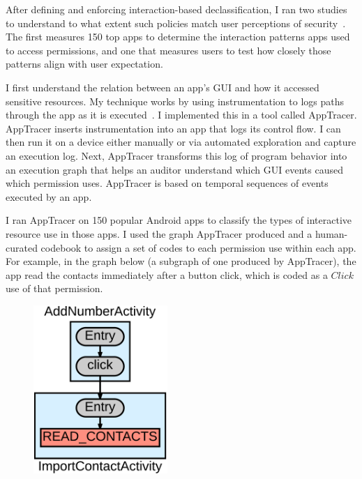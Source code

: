 After defining and enforcing interaction-based declassification, I ran
two studies to understand to what extent such policies match user
perceptions of security~\cite{micinski2017user}. The first measures
150 top apps to determine the interaction patterns apps used to access
permissions, and one that measures users to test how closely those
patterns align with user expectation.

I first understand the relation between an app's GUI and how it
accessed sensitive resources. My technique works by using
instrumentation to logs paths through the app as it is
executed~\cite{micinski2017}. I implemented this in a tool
called AppTracer.  AppTracer inserts instrumentation into an app that
logs its control flow. I can then run it on a device either manually
or via automated exploration and capture an execution log. Next,
AppTracer transforms this log of program behavior into an execution
graph that helps an auditor understand which GUI events caused which
permission uses. AppTracer is based on temporal sequences of events
executed by an app.

I ran AppTracer on 150 popular Android apps to classify the types of
interactive resource use in those apps. I used the graph AppTracer
produced and a human-curated codebook to assign a set of codes to each
permission use within each app. For example, in the graph below
(a subgraph of one produced by AppTracer), the app read the contacts
immediately after a button click, which is coded as a $Click$ use of
that permission.

\begin{figure}[h]
  \begin{center}
    \includegraphics[width=2in]{click.png}
  \end{center}
\end{figure}

